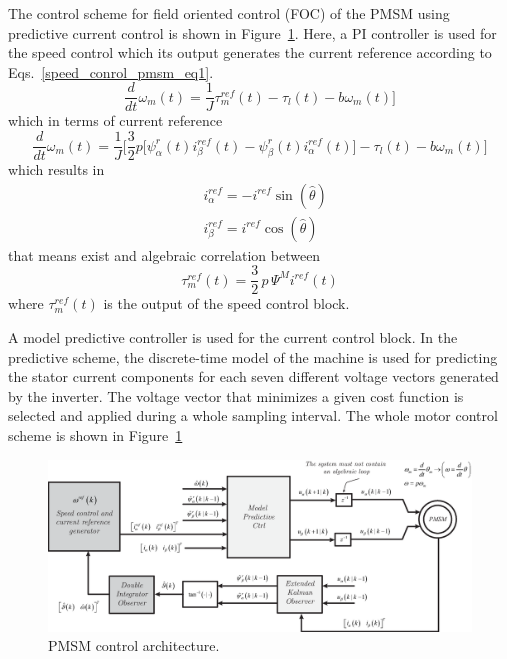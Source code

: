 \documentclass[11pt,a4paper,oneside]{book}
\numberwithin{equation}{section}
\theoremstyle{it}
\theoremstyle{definition}
\begin{document}
The control scheme for field oriented control (FOC) of the PMSM using 
predictive current control is shown in Figure~\ref{pmsmctrl}. Here, a PI 
controller is used for the speed control which its output generates the current 
reference according to Eqs.~\ref{speed_conrol_pmsm_eq1}. 
\begin{equation}\label{speed_conrol_pmsm_eq1}
	\frac{d}{dt}{\omega}_m(t) = 
	\frac{1}{J}\tau_m^{ref}(t)
	-\tau_l(t) -b{\omega}_m(t)\Bigg]
\end{equation}
which in terms of current reference
\begin{equation}\label{speed_conrol_pmsm_eq2}
	\frac{d}{dt}{\omega}_m(t) = 
	\frac{1}{J}\Bigg[\frac{3}{2}p\Big[\psi^r_{\alpha}(t)i_{\beta}^{ref}(t)-\psi^r_{\beta}(t)i_{\alpha}^{ref}(t)\Big]
	-\tau_l(t) -b{\omega}_m(t)\Bigg]
\end{equation}
which results in
\begin{equation}\label{speed_conrol_pmsm_eq3}
	\begin{aligned}
		&i_{\alpha}^{ref} = -i^{ref}\sin(\hat{\theta})  \\[6pt]
		&i_{\beta}^{ref} = i^{ref}\cos(\hat{\theta})
	\end{aligned} 
\end{equation}
that means exist and algebraic correlation between 
\begin{equation}
	\tau_m^{ref}(t)=\frac{3}{2}\,p\,\Psi^Mi^{ref}(t)
\end{equation}
where $\tau_m^{ref}(t)$ is the output of the speed control block.

A model predictive controller is used for the current control block. In the 
predictive scheme, the discrete-time model  of the machine is used for 
predicting the stator current components for each seven different voltage 
vectors generated by the inverter. The voltage vector that minimizes a given 
cost function is selected and applied during a whole sampling interval.
The whole motor control scheme is shown in Figure~\ref{pmsmctrl}
\begin{figure}[H]
	\centering
	\includegraphics[width = 500pt, angle=0, 
	keepaspectratio]{figures/mpc/pmsm_ctrl_ab_2.eps}
	\captionsetup{width=.5\textwidth}
	\caption{PMSM control architecture.}
	\label{pmsmctrl}
\end{figure}
\end{document}
